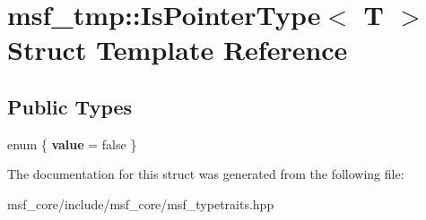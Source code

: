 \hypertarget{structmsf__tmp_1_1IsPointerType}{\section{msf\-\_\-tmp\-:\-:Is\-Pointer\-Type$<$ T $>$ Struct Template Reference}
\label{structmsf__tmp_1_1IsPointerType}
}
\subsection*{Public Types}
\begin{DoxyCompactItemize}
\item 
enum \{ {\bfseries value} =  false
 \}
\end{DoxyCompactItemize}


The documentation for this struct was generated from the following file\-:\begin{DoxyCompactItemize}
\item 
msf\-\_\-core/include/msf\-\_\-core/msf\-\_\-typetraits.\-hpp\end{DoxyCompactItemize}
